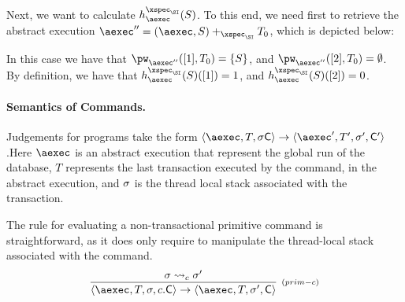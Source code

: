 \documentclass[a4paper,UKenglish]{article}%
\theoremstyle{plain}
\begin{document}
\begin{example}
Next, we want to calculate $\heap_{\aexec}^{\xspec_{\SI}}(S)$. To this end, we need first 
to retrieve the abstract execution $\aexec'' = (\aexec, S) \aeplus_{\xspec_{\SI}} T_0$, 
which is depicted below:
\begin{center}
\end{center}
In this case we have that $\pw_{\aexec''}([1],T_0) = \{S\}$, 
and $\pw_{\aexec''}([2], T_0) = \emptyset$. By definition, 
we have that $\heap_{\aexec}^{\xspec_{\SI}}(S)([1]) = 1$, 
and $\heap_{\aexec}^{\xspec_{\SI}}(S)([2]) = 0$.
\end{example}

\paragraph{\textbf{Semantics of Commands.}}
Judgements for programs take the form 
$\langle \aexec, T, \thdstack \Cmd \rangle \rightarrow \langle \aexec', T',  \thdstack', \Cmd' \rangle
$.Here $\aexec$ is an abstract execution that represent 
the global run of the database, 
$T$ represents the last transaction executed by the command, in the abstract execution, 
and $\sigma$ is the thread local stack associated with the transaction.

The rule for evaluating a non-transactional primitive command is straightforward, as it 
does only require to manipulate the thread-local stack associated  with the command. 
\[
\infer[{\scriptstyle{(prim-c)}}]
{\langle \aexec, T, \thdstack, \primc.\Cmd \rangle \rightarrow \langle \aexec, T, \thdstack', \Cmd \rangle}
{\thdstack \rightsquigarrow_c \thdstack'} 
\]
\end{document}
